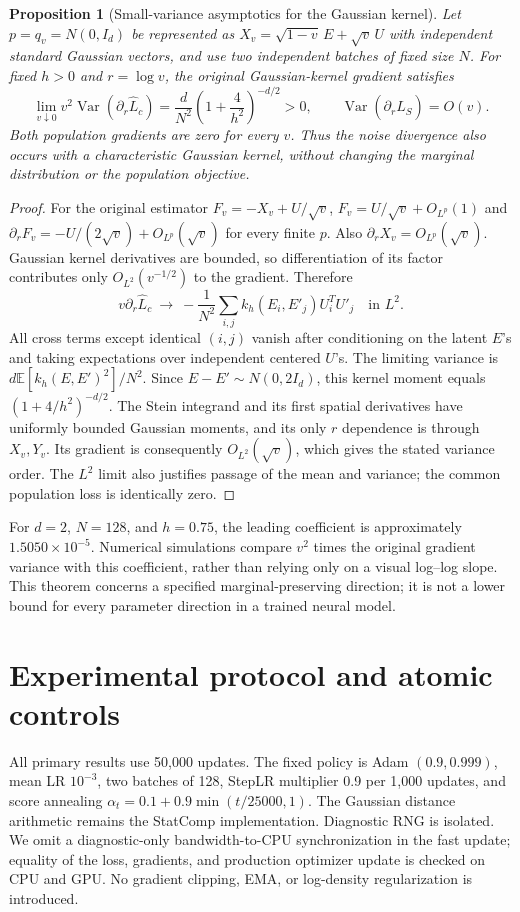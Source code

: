 \documentclass[11pt,a4paper]{article}
\newtheorem{proposition}{Proposition}[section]
\newcommand{\E}{\mathbb E}
\newcommand{\Var}{\operatorname{Var}}
\begin{document}
\begin{proposition}[Small-variance asymptotics for the Gaussian kernel]
Let $p=q_v=N(0,I_d)$ be represented as
$X_v=\sqrt{1-v}\,E+\sqrt v\,U$ with independent standard Gaussian vectors,
and use two independent batches of fixed size $N$. For fixed $h>0$ and
$r=\log v$, the original Gaussian-kernel gradient satisfies
\begin{equation}
 \lim_{v\downarrow0}v^2\Var(\partial_r\widehat L_c)
 =\frac{d}{N^2}\left(1+\frac4{h^2}\right)^{-d/2}>0,
 \qquad \Var(\partial_r\widehat L_S)=O(v).
 \label{eq:rbf-asymptotic}
\end{equation}
Both population gradients are zero for every $v$. Thus the noise divergence
also occurs with a characteristic Gaussian kernel, without changing the
marginal distribution or the population objective.
\end{proposition}
\begin{proof}
For the original estimator $F_v=-X_v+U/\sqrt v$,
$F_v=U/\sqrt v+O_{L^p}(1)$ and
$\partial_r F_v=-U/(2\sqrt v)+O_{L^p}(\sqrt v)$ for every finite $p$.
Also $\partial_rX_v=O_{L^p}(\sqrt v)$. Gaussian kernel derivatives are
bounded, so differentiation of its factor contributes only
$O_{L^2}(v^{-1/2})$ to the gradient. Therefore
\[
 v\partial_r\widehat L_c\ \longrightarrow\
 -\frac1{N^2}\sum_{i,j}k_h(E_i,E'_j)U_i^TU'_j
 \quad\text{in }L^2.
\]
All cross terms except identical $(i,j)$ vanish after conditioning on the
latent $E$'s and taking expectations over independent centered $U$'s.
The limiting variance is
$d\E[k_h(E,E')^2]/N^2$.
Since $E-E'\sim N(0,2I_d)$, this kernel moment equals
$(1+4/h^2)^{-d/2}$. The Stein integrand and its first spatial derivatives
have uniformly bounded Gaussian moments, and its only $r$ dependence is
through $X_v,Y_v$. Its gradient is consequently $O_{L^2}(\sqrt v)$,
which gives the stated variance order. The $L^2$ limit also justifies passage
of the mean and variance; the common population loss is identically zero.
\end{proof}

For $d=2$, $N=128$, and $h=0.75$, the leading coefficient is approximately
$1.5050\times10^{-5}$. Numerical simulations compare $v^2$ times the original
gradient variance with this coefficient, rather than relying only on a visual
log--log slope. This theorem concerns a specified marginal-preserving direction;
it is not a lower bound for every parameter direction in a trained neural model.

\section{Experimental protocol and atomic controls}
All primary results use 50,000 updates. The fixed policy is Adam
$(0.9,0.999)$, mean LR $10^{-3}$, two batches of 128, StepLR multiplier 0.9
per 1,000 updates, and score annealing
$\alpha_t=0.1+0.9\min(t/25000,1)$. The Gaussian distance arithmetic remains
the StatComp implementation. Diagnostic RNG is isolated. We omit a
diagnostic-only bandwidth-to-CPU synchronization in the fast update; equality
of the loss, gradients, and production optimizer update is checked on CPU and
GPU. No gradient clipping, EMA, or log-density regularization is introduced.
\end{document}
